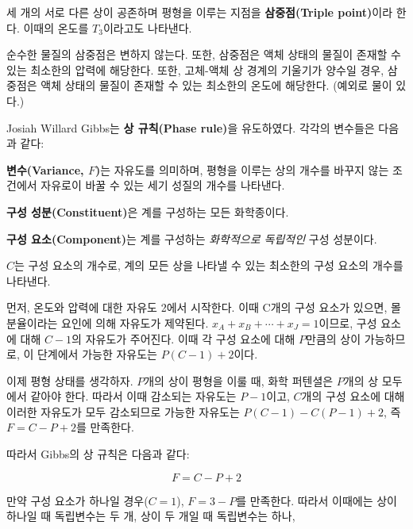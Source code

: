         \begin{defn}[삼중점]
        세 개의 서로 다른 상이 공존하며 평형을 이루는 지점을 \textbf{삼중점(Triple point)}이라 한다. 이때의 온도를 $T_3$이라고도 나타낸다.
        \end{defn}
        순수한 물질의 삼중점은 변하지 않는다. 또한, 삼중점은 액체 상태의 물질이 존재할 수 있는 최소한의 압력에 해당한다. 또한, 고체-액체 상 경계의 
        기울기가 양수일 경우, 삼중점은 액체 상태의 물질이 존재할 수 있는 최소한의 온도에 해당한다. (예외로 물이 있다.)
        \par Josiah Willard Gibbs는 \textbf{상 규칙(Phase rule)}을 유도하였다. 각각의 변수들은 다음과 같다:
        \begin{enum}
            \item \textbf{변수(Variance, $F$)}는 자유도를 의미하며, 평형을 이루는 상의 개수를 바꾸지 않는 조건에서 자유로이 바꿀 수 있는 세기 성질의 개수를 나타낸다.
            \item \textbf{구성 성분(Constituent)}은 계를 구성하는 모든 화학종이다.
            \item \textbf{구성 요소(Component)}는 계를 구성하는 \textit{화학적으로 독립적인} 구성 성분이다.
            \item $C$는 구성 요소의 개수로, 계의 모든 상을 나타낼 수 있는 최소한의 구성 요소의 개수를 나타낸다.
        \end{enum}
        \par 먼저, 온도와 압력에 대한 자유도 2에서 시작한다. 이때 C개의 구성 요소가 있으면, 몰 분율이라는 요인에 의해 자유도가 제약된다. 
        $x_A + x_B + \cdots + x_J = 1$이므로, 구성 요소에 대해 $C-1$의 자유도가 주어진다. 이때 각 구성 요소에 대해 $P$만큼의 상이 가능하므로, 
        이 단계에서 가능한 자유도는 $P\left(C-1\right)+2$이다.
        \par 이제 평형 상태를 생각하자. $P$개의 상이 평형을 이룰 때, 화학 퍼텐셜은 $P$개의 상 모두에서 같아야 한다. 따라서 이때 감소되는 
        자유도는 $P-1$이고, $C$개의 구성 요소에 대해 이러한 자유도가 모두 감소되므로 가능한 자유도는 $P\left(C-1\right)-C\left(P-1\right) + 2$, 즉 
        $F = C - P + 2$를 만족한다.
        \par 따라서 Gibbs의 상 규칙은 다음과 같다:
        \begin{law}[상 규칙]
        \begin{equation*}
            F = C- P +2
        \end{equation*}
        \end{law}
        만약 구성 요소가 하나일 경우($C=1$), $F = 3-P$를 만족한다. 따라서 이때에는 상이 하나일 때 독립변수는 두 개, 상이 두 개일 때 독립변수는 하나, 
